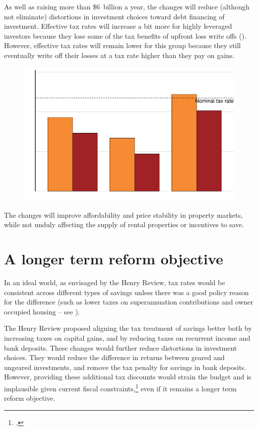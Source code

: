 \documentclass{grattanAlpha}\usepackage[]{graphicx}\usepackage[]{color}
\begin{document}
As well as raising more than \$6~billion a year, the changes will reduce (although not eliminate) distortions in investment choices toward debt financing of investment. Effective tax rates will increase a bit more for highly leveraged investors because they lose some of the tax benefits of upfront loss write offs (). However, effective tax rates will remain lower for this group because they still eventually write off their losses at a tax rate higher than they pay on gains.  
\begin{figure}
\label{fig:16}
\includegraphics[width=\columnwidth]{CGT-NG-atlas/Figure16-R.pdf}
\end{figure}
The changes will improve affordability and price stability in property markets, while not unduly affecting the supply of rental properties or incentives to save.

\section{A longer term reform objective}\label{sec:A-longer-term-reform-objective}
In an ideal world, as envisaged by the Henry Review, tax rates would be consistent across different types of savings unless there was a good policy reason for the difference (such as lower taxes on superannuation contributions and owner occupied housing – see ). 

The Henry Review proposed aligning the tax treatment of savings better both by increasing taxes on capital gains, and by reducing taxes on recurrent income and bank deposits. These changes would further reduce distortions in investment choices. They would reduce the difference in returns between geared and ungeared investments, and remove the tax penalty for savings in bank deposits. However, providing these additional tax discounts would strain the budget and is implausible given current fiscal constraints,\footcites{Daley2015} even if it remains a longer term reform objective.
\end{document}
